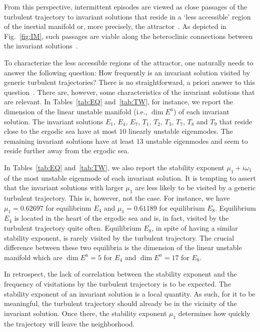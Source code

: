 \documentclass{article}
\begin{document}
From this perspective, intermittent episodes are viewed as close passages of the
turbulent trajectory to invariant solutions that reside in a `less accessible' region of the
inertial manifold or, more precisely, the attractor~\citep{holmes93}.
As depicted in Fig.~\ref{fig:IM}, such passages are viable along the heteroclinic connections
between the invariant solutions~\citep{holmes92,Holmes96}.

To characterize the less accessible regions of the attractor, one naturally needs to
answer the following question:
How frequently is an invariant solution visited by generic turbulent trajectories?
There is no straightforward, a priori answer to this
question~\cite[Chapter 23]{DasBuch}. There are, however,
some characteristics of the invariant solutions that are relevant. In Tables~\ref{tab:EQ}
and~\ref{tab:TW}, for instance, we report the dimension of the linear unstable manifold
(i.e., $\dim E^u$) of each invariant solution.
The invariant solutions $E_1$, $E_4$, $E_7$, $T_1$, $T_2$, $T_3$, $T_7$,
$T_8$ and $T_9$ that reside close to the ergodic sea have at most $10$
linearly unstable eigenmodes. The remaining invariant solutions have at
least $13$ unstable eigenmodes and seem to reside further away from the
ergodic sea.

In Tables~\ref{tab:EQ}
and~\ref{tab:TW}, we also report the stability exponent $\mu_1+i\omega_1$ of the most unstable
eigenmode of each invariant solution. It is tempting to assert that the
invariant solutions with larger $\mu_1$ are less likely to be visited by a generic turbulent
trajectory. This is, however, not the case. For instance, we have $\mu_1=0.62697$ for equilibrium
$E_4$ and $\mu_1=0.61189$ for equilibrium $E_8$. Equilibrium $E_4$ is located in the heart of
the ergodic sea and is, in fact, visited by the turbulent trajectory quite often. Equilibrium $E_8$,
in spite of having a similar stability exponent, is rarely visited by the turbulent trajectory.
The crucial difference between these two equilibria is the dimension of the linear unstable
manifold which are $\dim E^u=5$ for $E_4$ and $\dim E^u=17$ for $E_8$.

In retrospect, the lack of correlation between the stability exponent and the frequency
of visitations by the turbulent trajectory is to be expected. The stability exponent
of an invariant solution is a
local quantity. As such, for it to be meaningful, the turbulent trajectory should
already be in the vicinity of the invariant solution. Once there,
the stability exponent $\mu_1$ determines how quickly the trajectory will leave
the neighborhood.
\end{document}
